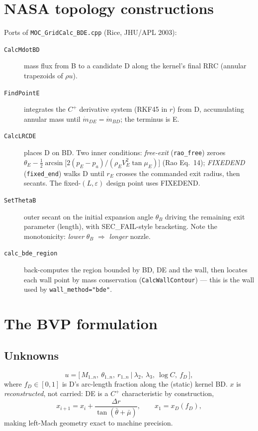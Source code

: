 \documentclass[11pt]{article}
\begin{document}
\section{NASA topology constructions}
Ports of \texttt{MOC\_GridCalc\_BDE.cpp} (Rice, JHU/APL 2003):
\begin{description}
  \item[\texttt{CalcMdotBD}] mass flux from B to a candidate D along the
  kernel's final RRC (annular trapezoids of $\rho u$).
  \item[\texttt{FindPointE}] integrates the $C^{+}$ derivative system
  (RKF45 in $r$) from D, accumulating annular mass until
  $\dot m_{DE}=\dot m_{BD}$; the terminus is E.
  \item[\texttt{CalcLRCDE}] places D on BD.  Two inner conditions:
  \emph{free-exit} (\texttt{rao\_free}) zeroes
  $\theta_E-\tfrac12\arcsin\!\big[2(p_E-p_a)/(\rho_E V_E^2\tan\mu_E)\big]$
  (Rao Eq.~14); \emph{FIXEDEND} (\texttt{fixed\_end}) walks D until
  $r_E$ crosses the commanded exit radius, then secants.  The fixed-$
  (L,\varepsilon)$ design point uses FIXEDEND.
  \item[\texttt{SetThetaB}] outer secant on the initial expansion angle
  $\theta_B$ driving the remaining exit parameter (length), with
  SEC\_FAIL-style bracketing.  Note the monotonicity: \emph{lower}
  $\theta_B$ $\Rightarrow$ \emph{longer} nozzle.
  \item[\texttt{calc\_bde\_region}] back-computes the region bounded by
  BD, DE and the wall, then locates each wall point by mass
  conservation (\texttt{CalcWallContour}) --- this is the wall used by
  \texttt{wall\_method="bde"}.
\end{description}

\section{The BVP formulation}
\subsection{Unknowns}
\begin{equation}
u = \big[\,M_{1..n},\ \theta_{1..n},\ r_{1..n}\ \big|\
\lambda_2,\ \lambda_3,\ \log C,\ f_D\,\big],
\end{equation}
where $f_D\in[0,1]$ is D's arc-length fraction along the (static)
kernel BD.  $x$ is \emph{reconstructed}, not carried: DE is a $C^{+}$
characteristic by construction,
\begin{equation}
x_{i+1} = x_i + \frac{\Delta r}{\tan(\bar\theta+\bar\mu)},\qquad
x_1 = x_D(f_D),
\end{equation}
making left-Mach geometry exact to machine precision.
\end{document}
